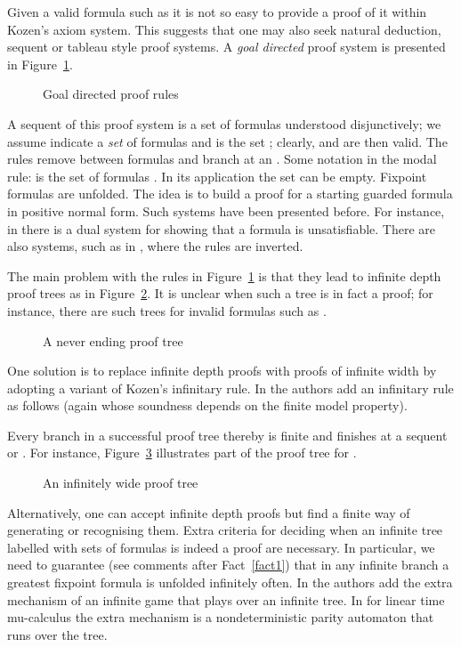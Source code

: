 \documentclass[copyright,creativecommons]{eptcs}
\def\w{\emph}
\begin{document}
Given a valid formula such as 
it is not so easy to provide a proof of it within Kozen's  axiom  system. 
This suggests that one may also seek natural deduction,  sequent or
tableau  style
proof  systems.  A  \w{goal directed} 
proof system is presented in Figure~\ref{fig2}.
\begin{figure}




\caption{Goal directed proof rules} 
\label{fig2}
\end{figure}
A sequent of this proof system is a set of formulas understood
disjunctively; we assume  indicate a \w{set}
of formulas and   is the set
; clearly,  and  are then valid. The rules remove  between formulas and branch
at an . Some notation in the modal rule: 
is the set of formulas .
In its application the set  can be empty.
Fixpoint formulas are unfolded. The idea is to build
a proof for a starting guarded formula  in positive normal form.
Such systems have been presented before. For instance,
in \cite{NiWa96} there is a dual system
for showing that a formula is unsatisfiable.
There are also systems, such as in \cite{DHL06,JKS08,Stu08},  
where the rules are
inverted. 

The main problem with the rules in Figure~\ref{fig2} is
that they lead to  infinite depth proof trees  as in
Figure~\ref{fig3}.  It is unclear when such a tree is in
fact a proof; for instance, there are such trees
for invalid formulas such as 
.  
\begin{figure}

\caption{A never ending proof tree} 
\label{fig3}
\end{figure}
One solution is to replace  infinite depth  proofs with proofs of infinite
width by adopting a variant
of  Kozen's infinitary rule. 
In \cite{JKS08, Stu08} the authors add 
an infinitary rule as follows (again whose soundness
depends on the finite model property).  


 

Every branch in a successful  proof tree thereby is  finite and finishes
at a sequent  or . For
instance, Figure~\ref{fig30} illustrates part of the proof tree
for .
\begin{figure}


\caption{An infinitely wide proof tree} 
\label{fig30}
\end{figure}

Alternatively, one can accept infinite depth proofs but find a finite 
way of generating or recognising  them. 
Extra criteria for deciding when an infinite tree labelled with sets
of formulas is indeed a proof are necessary. In particular, we need to guarantee
(see comments after Fact~\ref{fact1}) that in any infinite branch
a greatest    fixpoint 
formula is  unfolded infinitely often. 
In \cite{NiWa96} the authors  add the  extra 
mechanism of an   infinite  game that plays
over an  infinite tree. 
In \cite{DHL06} 
for linear time mu-calculus the extra mechanism is a nondeterministic parity
automaton that runs over the tree. 
\end{document}
